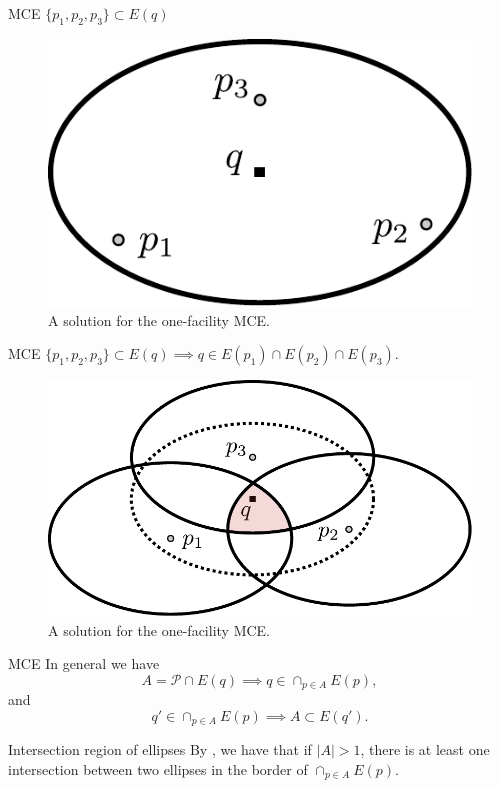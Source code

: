 \documentclass{beamer}
\newcommand{\Pp}{\mathscr{P}}
\theoremstyle{definition}
\begin{document}
\begin{frame}{MCE}
	$\{p_1, p_2, p_3\} \subset E(q)$
	\begin{figure}
		\centering
		\includegraphics[scale=.55]{figures/mce-mwc0}
		\caption{A solution for the one-facility MCE.}
	\end{figure}
\end{frame}

\begin{frame}{MCE}
	$\{p_1, p_2, p_3\} \subset E(q) \implies q \in E(p_1) \cap E(p_2) \cap E(p_3)$.
	\begin{figure}
		\centering
		\includegraphics[scale=.55]{figures/mce-mwc}
		\caption{A solution for the one-facility MCE.}
	\end{figure}
\end{frame}

\begin{frame}{MCE}
	In general we have
	\begin{equation*}
	A = \Pp \cap E(q) \implies 	q \in \cap_{p \in A} E(p),
	\end{equation*}
and
	\begin{equation*}
	q' \in \cap_{p \in A} E(p) \implies	A \subset E(q').
	\end{equation*}
	
	\begin{block}{Intersection region of ellipses}
		By \cite{bi}, we have that if $|A|>1$, there is at least one intersection between two ellipses in the border of $\cap_{p\in A} E(p)$.
	\end{block}
\end{frame}
\end{document}
